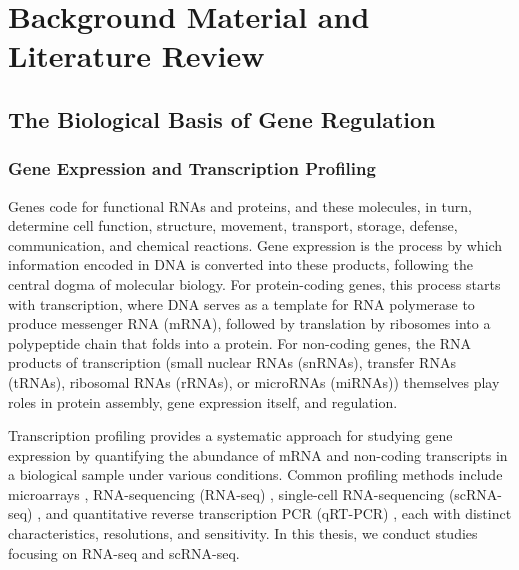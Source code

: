 \chapter{Background Material and Literature Review}
\label{chap:background}

\section*{The Biological Basis of Gene Regulation}
\subsection*{Gene Expression and Transcription Profiling}

Genes code for functional \textsc{RNA}s and proteins, and these molecules, in turn, determine cell function, structure, movement, transport, storage, defense, communication, and chemical reactions. Gene expression is the process by which information encoded in \textsc{DNA} is converted into these products, following the central dogma of molecular biology. For protein-coding genes, this process starts with transcription, where \textsc{DNA} serves as a template for \textsc{RNA} polymerase to produce messenger \textsc{RNA} (m\textsc{RNA}), followed by translation by ribosomes into a polypeptide chain that folds into a protein. For non-coding genes, the \textsc{RNA} products of transcription (small nuclear \textsc{RNA}s (sn\textsc{RNA}s), transfer \textsc{RNA}s (t\textsc{RNA}s), ribosomal \textsc{RNA}s (r\textsc{RNA}s), or microRNAs (mi\textsc{RNA}s)) themselves play roles in protein assembly, gene expression itself, and regulation. 

Transcription profiling provides a systematic approach for studying gene expression by quantifying the abundance of mRNA and non-coding transcripts in a biological sample under various conditions. Common profiling methods include microarrays \cite{lockhart2000genomics}, RNA-sequencing (RNA-seq) \cite{wang2009rna}, single-cell RNA-sequencing (scRNA-seq) \cite{tang2009mrna}, and quantitative reverse transcription PCR (qRT-PCR) \cite{bustin2009miqe}, each with distinct characteristics, resolutions, and sensitivity. In this thesis, we conduct studies focusing on RNA-seq and scRNA-seq.

